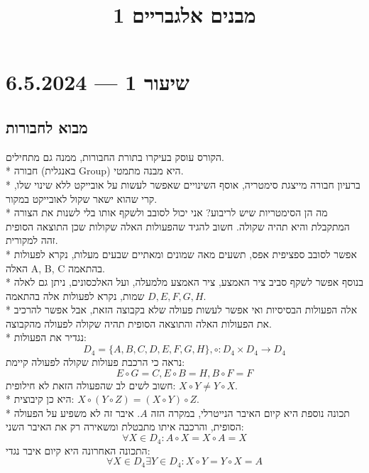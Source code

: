 
\title{מבנים אלגבריים 1}
\usepackage{hyperref}
\setcounter{secnumdepth}{2}

\hypersetup{}

\maketitle
\maketitleprint{}

\tableofcontents

\section{שיעור 1 --- 6.5.2024}
\subsection{מבוא לחבורות}
הקורס עוסק בעיקרו בתורת החבורות, ממנה גם מתחילים. \\*
חבורה (באנגלית Group) היא מבנה מתמטי. \\*
ברעיון חבורה מייצגת סימטריה, אוסף השינויים שאפשר לעשות על אובייקט ללא שינוי שלו, קרי שהוא ישאר שקול לאובייקט במקור. \\*
מה הן הסימטריות שיש לריבוע? אני יכול לסובב ולשקף אותו בלי לשנות את הצורה המתקבלת והיא תהיה שקולה. חשוב להגיד שהפעולות האלה שקולות שכן התוצאה הסופית זהה למקורית. \\*
אפשר לסובב ספציפית אפס, תשעים מאה שמונים ומאתיים שבעים מעלות, נקרא לפעולות האלה A, B, C בהתאמה. \\*
בנוסף אפשר לשקף סביב ציר האמצע, ציר האמצע מלמעלה, ועל האלכסונים, ניתן גם לאלה שמות, נקרא לפעולות אלה בהתאמה $D, E, F, G, H$. \\*
אלה הפעולות הבסיסיות ואי אפשר לעשות פעולה שלא בקבוצה הזאת, אבל אפשר להרכיב את הפעולות האלה והתוצאה הסופית תהיה שקולה לפעולה מהקבוצה. \\*
נגדיר את הפעולות:
\[
	D_4 = \{ A, B, C, D, E, F, G, H \},
	\circ : D_4 \times D_4 \to D_4
\]
נראה כי הרכבת פעולות שקולה לפעולה קיימת:
\[
	E \circ G = C,
	E \circ B = H,
	B \circ F = F
\]
חשוב לשים לב שהפעולה הזאת לא חילופית: $X \circ Y \ne Y \circ X$. \\*
היא כן קיבוצית: $X \circ (Y \circ Z) = (X \circ Y) \circ Z$. \\*
תכונה נוספת היא קיום האיבר הנייטרלי, במקרה הזה $A$. איבר זה לא משפיע על הפעולה הסופית, והרכבה איתו מתבטלת ומשאירה רק את האיבר השני:
\[
	\forall X \in D_4 : A \circ X = X \circ A = X
\]
התכונה האחרונה היא קיום איבר נגדי:
\[
	\forall X \in D_4 \exists Y \in D_4 : X \circ Y = Y \circ X = A
\]

